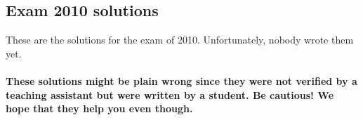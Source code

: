 \documentclass[main]{subfiles}
\begin{document}

\subsection{Exam 2010 solutions}
These are the solutions for the exam of 2010. Unfortunately, nobody wrote them yet.
\\\\
\textbf{These solutions might be plain wrong since they were not verified by a teaching assistant but were written by a student. Be cautious! We hope that they help you even though.}

\end{document}
